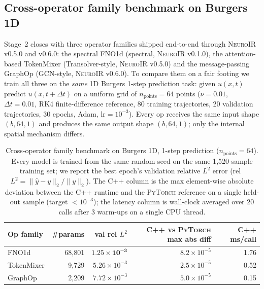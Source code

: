 \documentclass[10pt,twocolumn]{article}
\newcommand{\neuroir}{\textsc{NeuroIR}}
\newcommand{\fno}{\textsc{FNO}}
\newcommand{\py}{\textsc{PyTorch}}
\begin{document}
\subsection{Cross-operator family benchmark on Burgers 1D}
\label{sec:op-benchmark}

Stage~2 closes with three operator families
shipped end-to-end through \neuroir{} v0.5.0 and v0.6.0: the
spectral \fno{}1d (spectral, \neuroir{} v0.1.0), the
attention-based TokenMixer (Transolver-style, \neuroir{}
v0.5.0) and the message-passing GraphOp (GCN-style,
\neuroir{} v0.6.0).  To compare them on a fair
footing we train all three on the \emph{same} 1D Burgers
1-step prediction task: given $u(x, t)$ predict
$u(x, t + \Delta t)$ on a uniform grid of $n_{\mathrm{points}}=64$
points ($\nu = 0.01$, $\Delta t = 0.01$, RK4 finite-difference
reference, 80 training trajectories, 20 validation
trajectories, 30 epochs, Adam, $\mathrm{lr}=10^{-3}$).  Every
op receives the same input shape $(b, 64, 1)$ and produces
the same output shape $(b, 64, 1)$; only the internal spatial
mechanism differs.

\begin{table}[t]
  \centering
  \small
  \begin{tabular}{lrrrr}
    \toprule
    Op family        & \#params  & val rel $L^2$ & C{++} vs \py{} max abs diff & C{++} ms/call \\
    \midrule
    \fno{}1d        & 68{,}801 & $\mathbf{1.25 \times 10^{-3}}$ & $8.2 \times 10^{-5}$ & 1.76 \\
    TokenMixer      &  9{,}729 & $5.26 \times 10^{-3}$           & $2.5 \times 10^{-5}$ & 0.52 \\
    GraphOp         &  2{,}209 & $7.72 \times 10^{-3}$           & $5.0 \times 10^{-5}$ & 0.15 \\
    \bottomrule
  \end{tabular}
  \caption{Cross-operator family benchmark on Burgers 1D, 1-step
  prediction ($n_{\mathrm{points}}=64$).  Every model is trained
  from the same random seed on the same 1{,}520-sample training
  set; we report the best epoch's validation relative $L^2$ error
  (rel~$L^2 = \lVert \hat{y} - y \rVert_2 / \lVert y \rVert_2$).
  The C{++} column is the max element-wise absolute deviation
  between the C{++} runtime and the \py{} reference on a single
  held-out sample (target $<\!10^{-3}$); the latency column is
  wall-clock averaged over 20 calls after 3 warm-ups on a single
  CPU thread.}
  \label{tab:op-benchmark}
\end{table}
\end{document}
